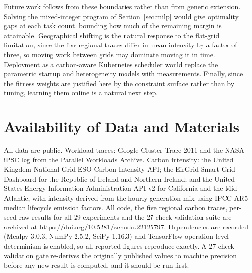 \documentclass[12pt,a4paper]{article}
\begin{document}
Future work follows from these boundaries rather than from generic extension. Solving the mixed-integer
program of Section~\ref{sec:milp} would give optimality gaps at each task count, bounding how much of the
remaining margin is attainable. Geographical shifting is the natural response to the flat-grid limitation,
since the five regional traces differ in mean intensity by a factor of three, so moving work between grids may
dominate moving it in time. Deployment as a carbon-aware Kubernetes scheduler would replace the parametric
startup and heterogeneity models with measurements. Finally, since the fitness weights are justified here by
the constraint surface rather than by tuning, learning them online is a natural next step.

\section*{Availability of Data and Materials}
All data are public. Workload traces: Google Cluster Trace 2011 \cite{reiss2011google} and the NASA-iPSC log
from the Parallel Workloads Archive. Carbon intensity: the United Kingdom National Grid ESO Carbon Intensity
API; the EirGrid Smart Grid Dashboard for the Republic of Ireland and Northern Ireland; and the United States
Energy Information Administration API v2 for California and the Mid-Atlantic, with intensity derived from the
hourly generation mix using IPCC AR5 median lifecycle emission factors. All code, the five regional carbon
traces, per-seed raw results for all 29 experiments and the 27-check validation suite are archived at
\url{https://doi.org/10.5281/zenodo.22125797}. Dependencies are recorded (Mealpy 3.0.3, NumPy 2.5.2, SciPy 1.16.3)
and TensorFlow operation-level determinism is enabled, so all reported figures reproduce exactly. A
27-check validation gate re-derives the originally published values to machine precision before any new result
is computed, and it should be run first.



\end{document}

